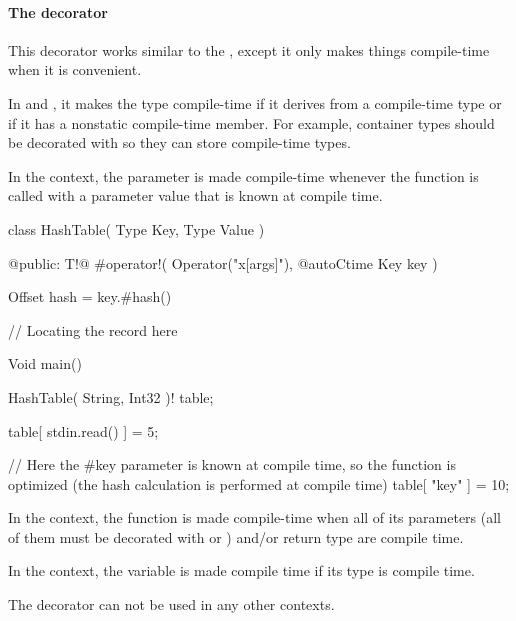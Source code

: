 \paragraph{The  decorator} \label{decorator:autoCtime} This decorator works similar to the , except it only makes things compile-time when it is convenient.

In  and , it makes the type compile-time if it derives from a compile-time type or if it has a nonstatic compile-time member. For example, container types should be decorated with  so they can store compile-time types.

In the  context, the parameter is made compile-time whenever the function is called with a parameter value that is known at compile time.
\begin{code}
class HashTable( Type Key, Type Value ) {

@public:
	T!@ #operator!( Operator("x[args]"), @autoCtime Key key ) {
		Offset hash = key.#hash() %
		
		// Locating the record here 
	}
	
}

Void main() {
	HashTable( String, Int32 )! table;
	
	table[ stdin.read() ] = 5;
	
	// Here the #key parameter is known at compile time, so the function is optimized (the hash calculation is performed at compile time)
	table[ "key" ] = 10;
}
\end{code}

In the  context, the function is made compile-time when all of its parameters (all of them must be decorated with  or ) and/or return type are compile time.

In the  context, the variable is made compile time if its type is compile time.

The decorator can not be used in any other contexts.

